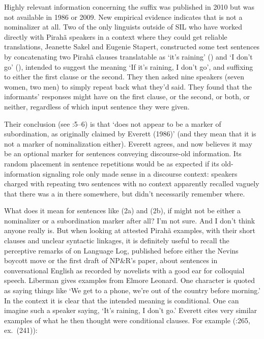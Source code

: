 \documentclass[output=paper,colorlinks,citecolor=brown
]{langscibook}
\begin{document}
Highly relevant information concerning the suffix \mbox{}
was published in 2010 but was not available in 1986 or 2009. New empirical
evidence indicates that \mbox{} is not a nominalizer at all.
Two of the only linguists outside of SIL who have worked directly
with Pirah{\~a} speakers in a context where they could get reliable
translations, Jeanette Sakel and Eugenie Stapert, constructed some
test sentences by concatenating two Pirah{\~a} clauses translatable
as `it's raining' () and `I don't go' (), intended to suggest the meaning `If it's raining,
I don't go', and suffixing \mbox{} to either the first
clause or the second. They then asked nine speakers (seven women, two
men) to simply repeat back what they'd said. They found that the
informants' responses might have \mbox{} on the first
clause, or the second, or both, or neither, regardless of which input
sentence they were given.

Their conclusion (see \citealt{SakeStap10}:5--6) is that
\mbox{} `does not appear to be a marker of subordination,
as originally claimed by Everett (1986)' (and they mean that it is
not a marker of nominalization either). Everett agrees, and now
believes it may be an optional marker for sentences conveying
discourse-old information. Its random placement in sentence repetitions
would be as expected if its old-information signaling role only made
sense in a discourse context: speakers charged with repeating two
sentences with no context apparently recalled vaguely that there was
a \mbox{} in there somewhere, but didn't necessarily
remember where.

What does it mean for sentences like (2a) and (2b), if \mbox{}
might not be either a nominalizer or a subordination marker after all?
I'm not sure. And I don't think anyone really is. But when looking at
attested Pirah{\~a} examples, with their short clauses and unclear
syntactic linkages, it is definitely useful to recall the perceptive
remarks of \citet{Liberman06} on Language Log, published before either
the Nevins boycott move or the first draft of NP\&R's paper, about
sentences in conversational English as recorded by novelists with a
good ear for colloquial speech. Liberman gives examples from Elmore
Leonard. One character is quoted as saying things like `We get to a
phone, we're out of the country before morning.' In the context it
is clear that the intended meaning is conditional. One can imagine
such a speaker saying, `It's raining, I don't go.' Everett cites very
similar examples of what he then thought were conditional clauses.
For example (\citealt{Everett86HAL}:265, ex.~(241)):
\end{document}
